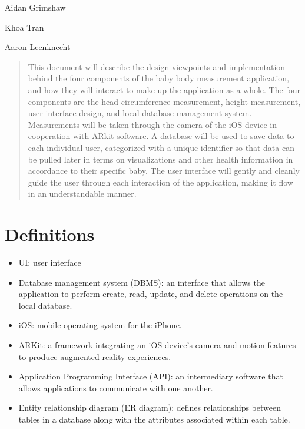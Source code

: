 \documentclass[onecolumn, draftclsnofoot,10pt, compsoc]{IEEEtran}
\def \GroupMemberOne{			Aidan Grimshaw}
\def \GroupMemberTwo{			Khoa Tran}
\def \GroupMemberThree{			Aaron Leenknecht}
\begin{document}
\begin{titlepage}
\begin{singlespace}
{{                \GroupMemberOne\par
                \GroupMemberTwo\par
                \GroupMemberThree\par
            }
            \vspace{.8in}
        }
        \begin{abstract}
            This document will describe the design viewpoints and implementation behind the four components of the baby body measurement application, and how they will interact to make up the application as a whole. The four components are the head circumference measurement, height measurement, user interface design, and local database management system. Measurements will be taken through the camera of the iOS device in cooperation with ARkit software. A database will be used to save data to each individual user, categorized with a unique identifier so that data can be pulled later in terms on visualizations and other health information in accordance to their specific baby. The user interface will gently and cleanly guide the user through each interaction of the application, making it flow in an understandable manner.
        \end{abstract}     
    \end{singlespace}
\end{titlepage}
\newpage
{}
\tableofcontents
\clearpage


\section{Definitions}
\begin{itemize}
    \item UI: user interface
    \item Database management system (DBMS): an interface that allows the application to perform create, read, update, and delete operations on the local database.
    \item iOS: mobile operating system for the iPhone.
    \item ARKit: a framework integrating an iOS device's camera and motion features to produce augmented reality experiences.
    \item Application Programming Interface (API): an intermediary software that allows applications to communicate with one another.
    \item Entity relationship diagram (ER diagram): defines relationships between tables in a database along with the attributes associated within each table.
    
\end{itemize}
\end{document}
